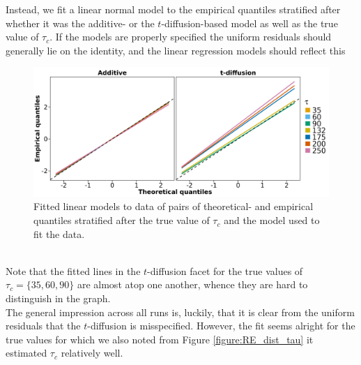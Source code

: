 Instead, we fit a linear normal model to the empirical quantiles stratified after whether it was the additive- or the $t$-diffusion-based model as well as the true value of $\tau_c$. If the models are properly specified the uniform residuals should generally lie on the identity, and the linear regression models should reflect this
\begin{figure}[h!]
    \begin{center}
        \includegraphics[scale = .075]{figures/quantiles_plot_tau.jpeg}
        \caption{Fitted linear models to data of pairs of theoretical- and empirical quantiles stratified after the true value of $\tau_c$ and the model used to fit the data.}
        \label{figure:QQ_plot_tau}
    \end{center}
\end{figure}\\
Note that the fitted lines in the $t$-diffusion facet for the true values of $\tau_c = \{35, 60, 90\}$ are almost atop one another, whence they are hard to distinguish in the graph. \\
The general impression across all runs is, luckily, that it is clear from the uniform residuals that the $t$-diffusion is misspecified. However, the fit seems alright for the true values for which we also noted from Figure \ref{figure:RE_dist_tau} it estimated $\tau_c$ relatively well. 
